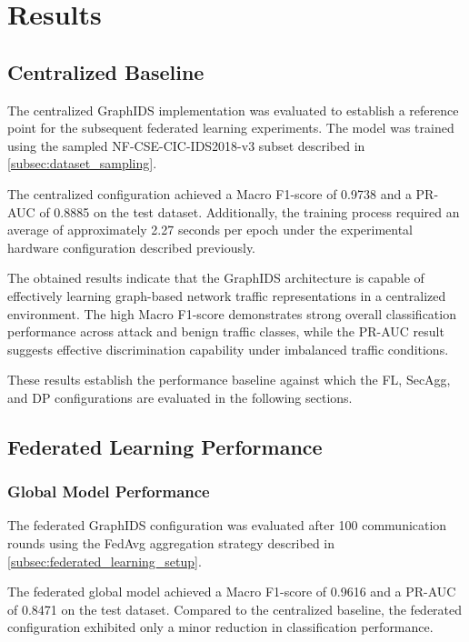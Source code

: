 \documentclass[conference]{IEEEtran}
\begin{document}
\section{Results}

\subsection{Centralized Baseline}

The centralized GraphIDS implementation was evaluated to establish a reference point for the subsequent federated learning experiments. The model was trained using the sampled NF-CSE-CIC-IDS2018-v3 subset described in \autoref{subsec:dataset_sampling}.

The centralized configuration achieved a Macro F1-score of 0.9738 and a PR-AUC of 0.8885 on the test dataset. Additionally, the training process required an average of approximately 2.27 seconds per epoch under the experimental hardware configuration described previously.

The obtained results indicate that the GraphIDS architecture is capable of effectively learning graph-based network traffic representations in a centralized environment. The high Macro F1-score demonstrates strong overall classification performance across attack and benign traffic classes, while the PR-AUC result suggests effective discrimination capability under imbalanced traffic conditions.

These results establish the performance baseline against which the FL, SecAgg, and DP configurations are evaluated in the following sections.

\subsection{Federated Learning Performance}

\subsubsection{Global Model Performance}

The federated GraphIDS configuration was evaluated after 100 communication rounds using the FedAvg aggregation strategy described in \autoref{subsec:federated_learning_setup}.

The federated global model achieved a Macro F1-score of 0.9616 and a PR-AUC of 0.8471 on the test dataset. Compared to the centralized baseline, the federated configuration exhibited only a minor reduction in classification performance.
\end{document}

